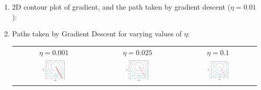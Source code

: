 \documentclass[12pt]{article}
\begin{document}
\begin{enumerate}[label=(\alph*)]
    \item \begin{center}2D contour plot of gradient, and the path taken by gradient descent ($\eta = 0.01$): \end{center}

    \clearpage

    \item Paths taken by Gradient Descent for varying values of $\eta$: 
    
    \begin{tabular}{c c c}
        $\eta = 0.001$ & $\eta = 0.025$ & $\eta = 0.1$ \\
        \includegraphics[width=0.3\textwidth]{../Q1/plots/e_contour_001.png} &
        \includegraphics[width=0.3\textwidth]{../Q1/plots/e_contour_025.png} &
        \includegraphics[width=0.3\textwidth]{../Q1/plots/e_contour_1.png} \\
    \end{tabular}


\end{enumerate}
\end{document}
